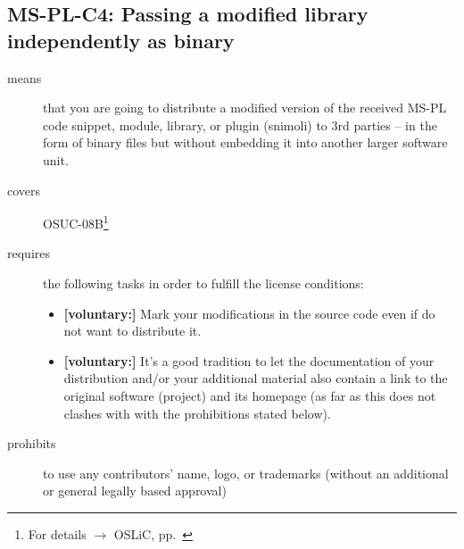 \subsection{MS-PL-C4: Passing a modified library independently as binary}
\label{OSUC-08B-MS-PL}
\begin{description}
\item[means] that you are going to distribute a modified version of the received
MS-PL code snippet, module, library, or plugin (snimoli) to 3rd parties -- in
the form of binary files but without embedding it into another larger software
unit.
\item[covers] OSUC-08B\footnote{For details $\rightarrow$ OSLiC, pp.\
\pageref{OSUC-08B-DEF}}
\item[requires] the following tasks in order to fulfill the license conditions:

\begin{itemize}
  
  \item \textbf{[voluntary:]} Mark your modifications in the source code even if
  do not want to distribute it.
  
  \item \textbf{[voluntary:]} It's a good tradition to let the documentation of
  your distribution and/or your additional material also contain a link to the
  original software (project) and its homepage (as far as this does not clashes
  with with the prohibitions stated below).
    
\end{itemize}

\item[prohibits] to use any contributors' name, logo, or trademarks (without an
additional or general legally based approval)

\end{description}

